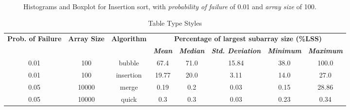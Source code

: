 \begin{figure}[H]
    \centering
    \caption{Histograms and Boxplot for Insertion sort, with \textit{probability of failure} of 0.01 and \textit{array size} of 100.}
    \label{fig-histogram-boxplot-insertion-001100}
\end{figure}

\begin{table}[H]
    \caption{Table Type Styles}
    \begin{center}
    \begin{tabular}{|c|c|c|c|c|c|c|c|}
    \hline
    \textbf{Prob. of Failure} & \textbf{Array Size} & \textbf{Algorithm} & \multicolumn{5}{|c|}{\textbf{Percentage of largest subarray size (\%LSS)}} \\
    \cline{4-8} 
    & & & \textbf{\textit{Mean}}& \textbf{\textit{Median}} & \textbf{\textit{Std. Deviation}} & \textbf{\textit{Minimum}} & \textbf{\textit{Maximum}} \\
    \hline
    0.01 & 100 & bubble & 67.4 & 71.0 & 15.84 & 38.0 & 100.0 \\
    \hline
    0.01 & 100 & insertion & 19.77 & 20.0 & 3.11 & 14.0 & 27.0 \\
    \hline
    0.05 & 10000 & merge & 0.19 & 0.2 & 0.03 & 0.15 & 28.86 \\
    \hline
    0.05 & 10000 & quick & 0.3 & 0.3 & 0.03 & 0.23 & 0.34 \\
    \hline
    \end{tabular}
    \label{tab-distribution-depentent-variable-lss}
    \end{center}
\end{table}

